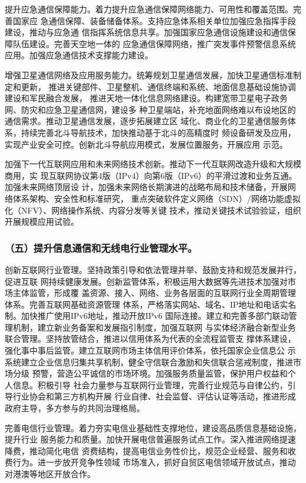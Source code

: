 \documentclass[11pt]{ctexart}
\begin{document}
{{{{提升应急通信保障能力。着力提升应急通信保障网络能力、可用性和覆盖范围。完善国家应
急通信保障、装备储备体系。支持应急体系相关单位加强应急指挥手段建设，推动与应急通
信指挥系统信息共享。加强国家应急通信设施建设和通信保障队伍建设。完善天空地一体的
应急通信保障网络，推广突发事件预警信息系统应用。加强应急通信技术支撑能力建设。

增强卫星通信网络及应用服务能力。统筹规划卫星通信发展，加快卫星通信标准制定和更新，
推进关键部件、卫星整机、通信终端和系统、地面信息基础设施协调建设和军民融合发展，
推进天地一体化信息网络建设。构建宽带卫星电子政务网、防灾和应急卫星通信网，建设多
种卫星端站，补充地面网络难以布设地区的通信需求。推动卫星通信发展，逐步拓展建立区
域化、商业化的卫星通信服务体系，持续完善北斗导航技术，加快推动基于北斗的高精度时
频设备研发及应用，实现产业安全可控。创新北斗导航应用模式，发展位置服务，开展应用
示范。

加强下一代互联网应用和未来网络技术创新。推动下一代互联网改造升级和大规模商用，实
现互联网协议第4版（IPv4）向第6版（IPv6）的平滑过渡和业务互通。加强未来网络顶层设
计，加强未来网络长期演进的战略布局和技术储备，开展网络体系架构、安全性和标准研究，
重点突破软件定义网络（SDN）/网络功能虚拟化（NFV）、网络操作系统、内容分发等关键
技术，推动关键技术试验验证，组织开展规模应用试验。


\subsubsection{（五）提升信息通信和无线电行业管理水平。}
\label{sec:org0ca9773}

创新互联网行业管理。坚持政策引导和依法管理并举、鼓励支持和规范发展并行，促进互联
网持续健康发展。创新监管体系，积极运用大数据等先进技术加强对市场主体监管，形成覆
盖资源、接入、网络、业务各层面的互联网行业全周期管理体系。完善互联网基础资源管理
体系，严格落实网站、域名、IP地址和电话实名制。加快推广使用IPv6地址，推动开放IPv6
国际连接。建立和完善多部门联动管理机制，建立新业务备案和发展指引制度，加强互联网
与实体经济融合新型业务联合管理。坚持放管结合，推进以信用体系为代表的全流程监管支
撑体系建设，强化事中事后监管。建立互联网市场主体信用评价体系，依托国家企业信息公
示系统建立企业信息归集共享机制，健全守信联合激励和失信联合惩戒制度，推进市场分级
预警，营造公平诚信的市场环境。加强服务质量监管，保护用户权益和个人信息。积极引导
社会力量参与互联网行业管理，完善行业规范与自律公约，引导行业协会和第三方机构开展
行业自律、社会监督、评估认证等活动，推进形成政府主导，多方参与的共同治理格局。

完善电信行业管理。着力夯实电信业基础性支撑地位，建设高品质信息基础设施，提升行业
服务能力和质量。加快开展电信普遍服务试点工作。深入推进网络提速降费，推动简化电信
资费结构，提高电信业务性价比，规范企业经营、服务和收费行为。进一步放开竞争性领域
市场准入，抓好自贸区电信领域开放试点，推动对港澳等地区开放合作。

}}}}
\end{document}
